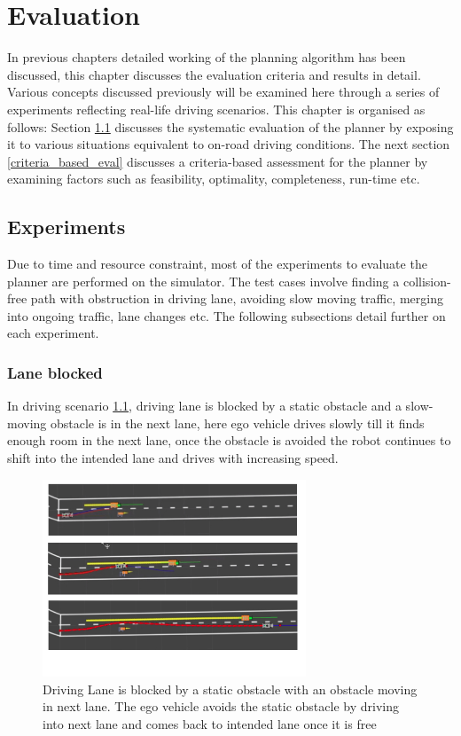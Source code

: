 \chapter{Evaluation}
\label{evaluation}
In previous chapters detailed working of the planning algorithm has been discussed, this chapter discusses the evaluation criteria and results in detail. Various concepts discussed previously will be examined here through a series of experiments reflecting real-life driving scenarios. This chapter is organised as follows: Section \ref{experiments} discusses the systematic evaluation of the planner by exposing it to various situations equivalent to on-road driving conditions. The next section \ref{criteria_based_eval} discusses a criteria-based assessment for the planner by examining factors such as feasibility, optimality, completeness, run-time etc.

\section{Experiments}\label{experiments}
Due to time and resource constraint, most of the experiments to evaluate the planner are performed on the simulator. The test cases involve finding a collision-free path with obstruction in driving lane, avoiding slow moving traffic, merging into ongoing traffic, lane changes etc. The following subsections detail further on each experiment. 

\subsection{Lane blocked}
In driving scenario  \ref{lane_blocked_1}, driving lane is blocked by a static obstacle and a slow-moving obstacle is in the next lane, here ego vehicle drives slowly till it finds enough room in the next lane, once the obstacle is avoided the robot continues to shift into the intended lane and drives with increasing speed. 

\begin{figure}[h]
    \centering
    \includegraphics[width=0.7\textwidth]{Images/evaluation/2_lane_blocked.jpg}
    \caption{Driving Lane is blocked by a static obstacle with an obstacle moving in next lane. The ego vehicle avoids the static obstacle by driving into next lane and comes back to intended lane once it is free}
    \label{lane_blocked_1}
\end{figure}

